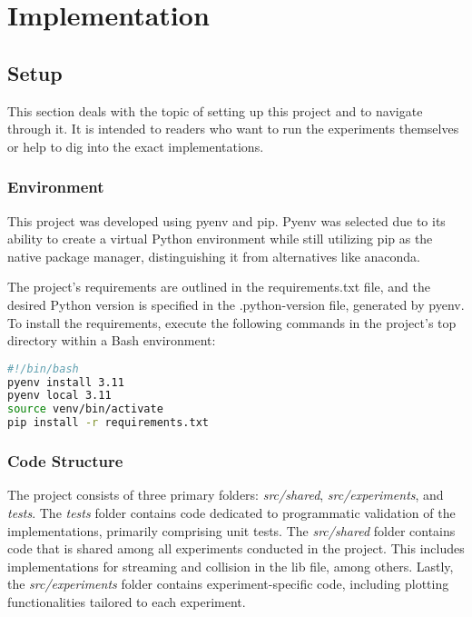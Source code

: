 \chapter{Implementation}


\section{Setup}
This section deals with the topic of setting up this project and to navigate through it.
It is intended to readers who want to run the experiments themselves or help to dig into the exact implementations.

\subsection{Environment}
This project was developed using pyenv and pip.
Pyenv was selected due to its ability to create a virtual Python environment while still utilizing pip as the native package manager, distinguishing it from alternatives like anaconda.
\newline

The project's requirements are outlined in the requirements.txt file, and the desired Python version is specified in the .python-version file, generated by pyenv.
To install the requirements, execute the following commands in the project's top directory within a Bash environment:

\begin{center}
    \begin{lstlisting}[language=bash]
#!/bin/bash
pyenv install 3.11
pyenv local 3.11
source venv/bin/activate
pip install -r requirements.txt
    \end{lstlisting}
\end{center}

\subsection{Code Structure}
The project consists of three primary folders: \textit{src/shared}, \textit{src/experiments}, and \textit{tests}.
The \textit{tests} folder contains code dedicated to programmatic validation of the implementations, primarily comprising unit tests.
The \textit{src/shared} folder contains code that is shared among all experiments conducted in the project.
This includes implementations for streaming and collision in the lib file, among others.
Lastly, the \textit{src/experiments} folder contains experiment-specific code, including plotting functionalities tailored to each experiment.


